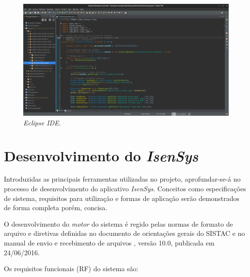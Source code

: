 \documentclass[
	12pt,			%
	openright,		%
	oneside,	
	a4paper,		%
	english,		%
	brazil			%
]{abntex2/abntex2}  %
\begin{document}
	\begin{figure}[H]
		\caption{\label{eclipse-ide}\textit{Eclipse IDE}.}
		\begin{center}
			\includegraphics[scale=0.25]{img/eclipse-ide}
		\end{center}
	\end{figure}

\chapter{Desenvolvimento do \textit{IsenSys}}

	Introduzidas as principais ferramentas utilizadas no projeto, aprofundar-se-á no processo de desenvolvimento do aplicativo \textit{IsenSys}. Conceitos como especificações de sistema, requisitos para utilização e formas de aplicação serão demonstrados de forma completa porém, concisa.
	
	O desenvolvimento do \textit{motor} do sistema é regido pelas normas de formato de arquivo e diretivas definidas no documento de orientações gerais do SISTAC \cite{sistac-gerais} e no manual de envio e recebimento de arquivos \cite{sistac-formatos}, versão 10.0, publicada em 24/06/2016.
	
	Os requisitos funcionais (RF) do sistema são:
	
\end{document}
